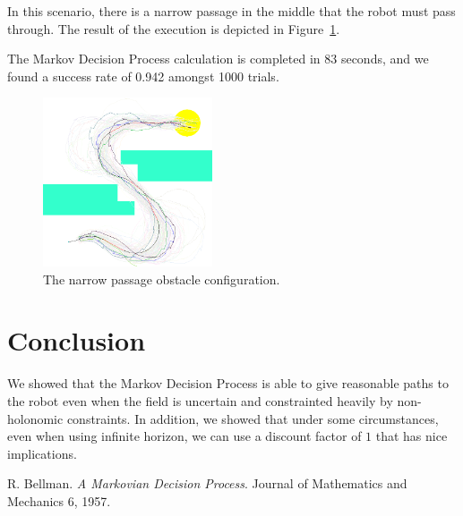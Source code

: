 \documentclass[a4paper]{article}
\begin{document}
In this scenario, there is a narrow passage in the middle that the robot
must pass through.
The result of the execution is depicted in Figure~\ref{f:narrow}.

The Markov Decision Process calculation is completed in 83 seconds,
and we found a success rate of 0.942 amongst 1000 trials.

\begin{figure}
\caption{The narrow passage obstacle configuration.}
\label{f:narrow}
\centerline{\includegraphics[width=5cm]{narrow.png}}
\end{figure}

\section{Conclusion}
We showed that the Markov Decision Process is able to give reasonable paths
to the robot even when the field is uncertain and constrainted heavily by
non-holonomic constraints. In addition, we showed that under some circumstances,
even when using infinite horizon, we can use a discount factor of $1$ that has
nice implications.

\begin{thebibliography}{100}

  R. Bellman. \emph{A Markovian Decision Process}. Journal of Mathematics and
  Mechanics 6, 1957.

\end{thebibliography}
\end{document}
